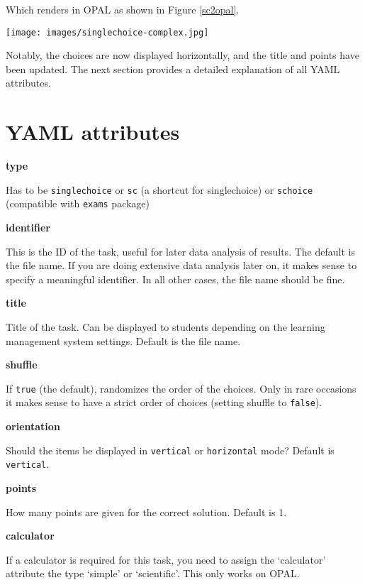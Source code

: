 \documentclass[twoside]{tufte-book}
\begin{document}
Which renders in OPAL as shown in Figure \ref{sc2opal}.

\begin{figure*}
\centering
\texttt{[image: images/singlechoice-complex.jpg]}
\caption{\label{sc2opal}More complex single choice task rendered in OPAL}
\end{figure*}
\newpage
Notably, the choices are now displayed horizontally, and the title and points have been updated. The next section provides a detailed explanation of all YAML attributes.

\section{YAML attributes}\label{YAML-attributes}

\noindent\textbf{type}\label{type}

Has to be \texttt{singlechoice} or \texttt{sc} (a shortcut for singlechoice) or \texttt{schoice} (compatible with \texttt{exams} package)

\noindent\textbf{identifier}\label{identifier}

This is the ID of the task, useful for later data analysis of results. The default is the file name. If you are doing extensive data analysis later on, it makes sense to specify a meaningful identifier. In all other cases, the file name should be fine.

\noindent\textbf{title}\label{title}

Title of the task. Can be displayed to students depending on the learning management system settings. Default is the file name.

\noindent\textbf{shuffle}\label{shuffle}

If \texttt{true} (the default), randomizes the order of the choices. Only in rare occasions it makes sense to have a strict order of choices (setting shuffle to \texttt{false}).

\noindent\textbf{orientation}\label{orientation}

Should the items be displayed in \texttt{vertical} or \texttt{horizontal} mode? Default is \texttt{vertical}.

\noindent\textbf{points}\label{points}

How many points are given for the correct solution. Default is 1.

\noindent\textbf{calculator}\label{calculator}

If a calculator is required for this task, you need to assign the `calculator' attribute the type `simple' or `scientific'. This only works on OPAL.
\end{document}
